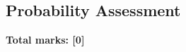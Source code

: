 \documentclass[../s1]{subfiles}
\begin{document}
\subsection*{Probability Assessment}
\thispagestyle{fancy}



\begin{flushright}
\textbf{Total marks: [0]}
\end{flushright}
\end{document}
